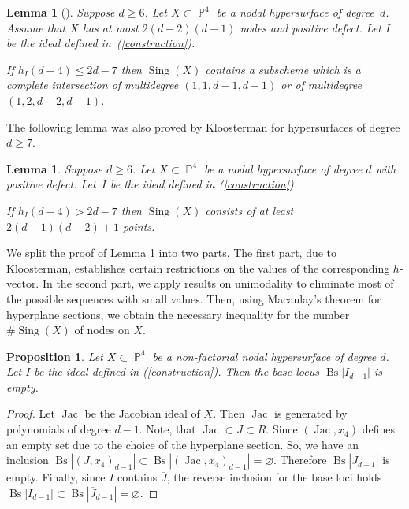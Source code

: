 \documentclass[a4paper,11pt,english,german]{amsart}
\DeclareMathOperator{\IP}{\mathbb{P}}
\DeclareMathOperator{\Sing}{Sing}
\DeclareMathOperator{\Bs}{Bs}
\DeclareMathOperator{\Jac}{Jac}
\newtheorem{lem}[thm]{Lemma}
\newtheorem{prop}[thm]{Proposition}
\theoremstyle{definition}
\begin{document}
\begin{lem}[{\cite[Lemma 5.3]{kloosterman2022maximal}}]\label{contains_ci}
Suppose $d\geqslant 6$. Let $X \subset \IP^4$ be a nodal hypersurface of degree~$d$. Assume that $X$ has at most $2(d-2)(d-1)$ nodes and positive defect. Let $I$ be the ideal defined in~\emph{(\ref{construction})}.

If $h_I(d-4)\leqslant 2d-7$ then $\Sing(X)$ contains a subscheme which is a complete intersection of multidegree $(1,1,d-1,d-1)$ or of multidegree $(1,2,d-2,d-1)$.
\end{lem}

The following lemma was also proved by Kloosterman for hypersurfaces of degree $d\geqslant 7$. 
 
\begin{lem}\label{d=6}
	Suppose $d\geqslant 6$. Let $X \subset \IP^4$ be a nodal hypersurface of degree $d$ with positive defect. Let~$I$ be the ideal defined in \emph{(\ref{construction})}.
	
		If $h_I(d-4)>2d-7$ then $\Sing(X)$ consists of at least $2(d-1)(d-2)+1$ points.
\end{lem}

We split the proof of Lemma \ref{d=6} into two parts. The first part, due to Kloosterman, establishes certain restrictions on the values of the corresponding $h$-vector.  In the second part, we apply results on unimodality to eliminate most of the possible sequences with small values.  Then, using Macaulay's theorem for hyperplane sections, we obtain the necessary inequality for the number $\#\Sing(X)$ of nodes on $X$.

\begin{prop}\label{base_locus}
	Let $X\subset \IP^4$ be a non-factorial nodal hypersurface of degree $d$. Let $I$ be the ideal defined in \emph{(\ref{construction})}. Then the base locus $\Bs|I_{d-1}|$ is empty.
\end{prop}
\begin{proof}
	Let $\Jac$ be the Jacobian ideal of $X$. Then $\Jac$ is generated by polynomials of degree $d-1$. Note, that $\Jac\subset J\subset R$. Since $(\Jac,x_4)$ defines an empty set due to the choice of the hyperplane section. So, we have an inclusion $\Bs|(J,x_4)_{d-1}|\subset \Bs|(\Jac,x_4)_{d-1}|=\varnothing$. Therefore $\Bs|\overline{J}_{d-1}|$ is empty. Finally, since $I$ contains $\overline{J}$, the reverse inclusion for the base loci holds $\Bs|I_{d-1}|\subset \Bs|\overline{J}_{d-1}|=\varnothing$. 
\end{proof}
\end{document}
